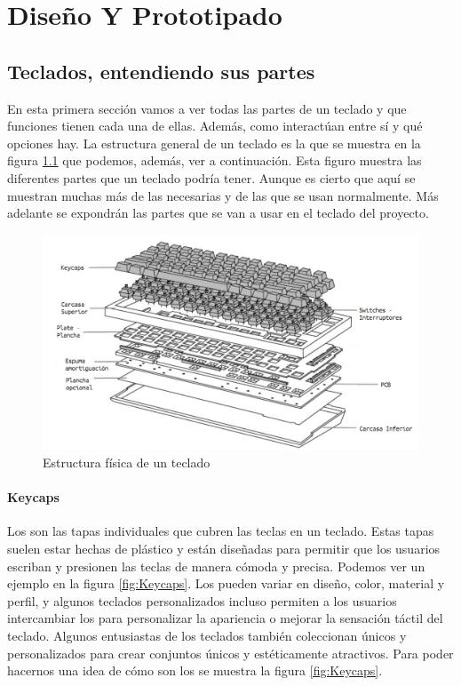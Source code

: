 \chapter{Diseño Y Prototipado} \label{CapDiseño}

\section{Teclados, entendiendo sus partes}

En esta primera sección vamos a ver todas las partes de un teclado y que funciones tienen cada una de ellas. Además, como interactúan entre sí y qué opciones hay. \cite{TearDownImageSource} La estructura general de un teclado es la que se muestra en la figura \ref{fig:TearDown} que podemos, además, ver a continuación. Esta figuro muestra las diferentes partes que un teclado podría tener. Aunque es cierto que aquí se muestran muchas más de las necesarias y de las que se usan normalmente. Más adelante se expondrán las partes que se van a usar en el teclado del proyecto.

\begin{figure}[H]
    \centering
    \includegraphics[width=1\textwidth]{imagenes/Capitulos/Cap03/KeyboardTeardown.png}
    \caption{Estructura física de un teclado \cite{TearDownImageSource}}
    \label{fig:TearDown}
\end{figure}



\subsubsection{\gls{Keycaps}}

Los  son las tapas individuales que cubren las teclas en un teclado. Estas tapas suelen estar hechas de plástico y están diseñadas para permitir que los usuarios escriban y presionen las teclas de manera cómoda y precisa. Podemos ver un ejemplo en la figura \ref{fig:Keycaps}. Los  pueden variar en diseño, color, material y perfil, y algunos teclados personalizados incluso permiten a los usuarios intercambiar los  para personalizar la apariencia o mejorar la sensación táctil del teclado. Algunos entusiastas de los teclados también coleccionan  únicos y personalizados para crear conjuntos únicos y estéticamente atractivos. Para poder hacernos una idea de cómo son los  se muestra la figura \ref{fig:Keycaps}.

